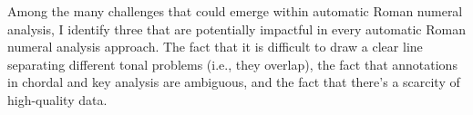 

Among the many challenges that could emerge within automatic
Roman numeral analysis, I identify three that are
potentially impactful in every automatic Roman numeral
analysis approach. The fact that it is difficult to draw a
clear line separating different tonal problems (i.e., they
overlap), the fact that annotations in chordal and key
analysis are ambiguous, and the fact that there's a scarcity
of high-quality data.
